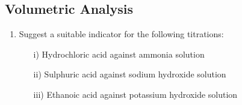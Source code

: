 \subsection{Volumetric Analysis}

\begin{enumerate}
	\item Suggest a suitable indicator for the following titrations:
		\begin{enumerate}[topsep=0ex,itemsep=0ex,partopsep=1ex,parsep=1ex]
		\item[i)] Hydrochloric acid against ammonia solution
		\item[ii)] Sulphuric acid against sodium hydroxide solution
		\item[iii)] Ethanoic acid against potassium hydroxide solution
	\end{enumerate}
\end{enumerate}







